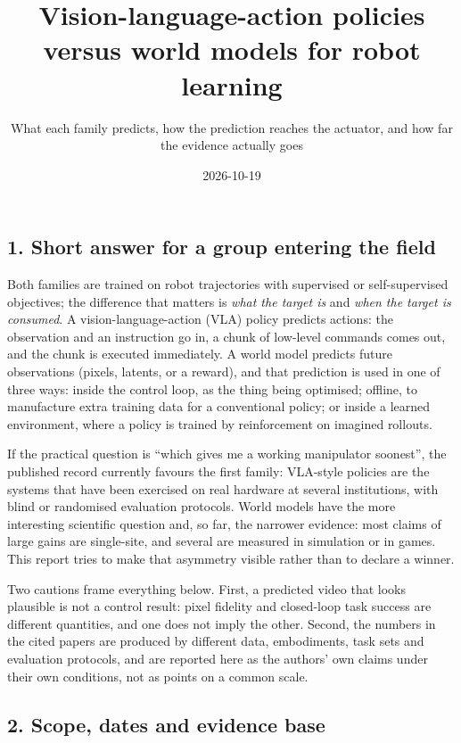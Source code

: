 \documentclass[
  10pt,
  english,
]{article}
\title{Vision-language-action policies versus world models for robot
learning}
\subtitle{What each family predicts, how the prediction reaches the
actuator, and how far the evidence actually goes}
\author{}
\date{2026-10-19}
\begin{document}
\maketitle

\hypertarget{short-answer-for-a-group-entering-the-field}{%
\subsection{1. Short answer for a group entering the
field}\label{short-answer-for-a-group-entering-the-field}}

Both families are trained on robot trajectories with supervised or
self-supervised objectives; the difference that matters is \emph{what
the target is} and \emph{when the target is consumed}. A
vision-language-action (VLA) policy predicts actions: the observation
and an instruction go in, a chunk of low-level commands comes out, and
the chunk is executed immediately. A world model predicts future
observations (pixels, latents, or a reward), and that prediction is used
in one of three ways: inside the control loop, as the thing being
optimised; offline, to manufacture extra training data for a
conventional policy; or inside a learned environment, where a policy is
trained by reinforcement on imagined rollouts.

If the practical question is ``which gives me a working manipulator
soonest'', the published record currently favours the first family:
VLA-style policies are the systems that have been exercised on real
hardware at several institutions, with blind or randomised evaluation
protocols. World models have the more interesting scientific question
and, so far, the narrower evidence: most claims of large gains are
single-site, and several are measured in simulation or in games. This
report tries to make that asymmetry visible rather than to declare a
winner.

Two cautions frame everything below. First, a predicted video that looks
plausible is not a control result: pixel fidelity and closed-loop task
success are different quantities, and one does not imply the other.
Second, the numbers in the cited papers are produced by different data,
embodiments, task sets and evaluation protocols, and are reported here
as the authors' own claims under their own conditions, not as points on
a common scale.

\hypertarget{scope-dates-and-evidence-base}{%
\subsection{2. Scope, dates and evidence
base}\label{scope-dates-and-evidence-base}}
\end{document}
